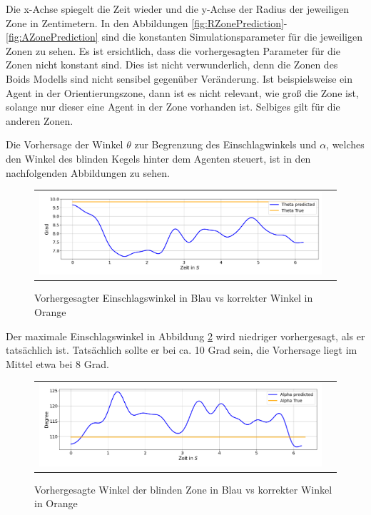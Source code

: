 Die x-Achse spiegelt die Zeit wieder und die y-Achse der Radius der jeweiligen Zone in Zentimetern. In den Abbildungen \ref{fig:RZonePrediction}-\ref{fig:AZonePrediction} sind die konstanten Simulationsparameter für die jeweiligen Zonen zu sehen. Es ist ersichtlich, dass die vorhergesagten Parameter für die Zonen nicht konstant sind.
Dies ist nicht verwunderlich, denn die Zonen des Boids Modells sind nicht sensibel gegenüber Veränderung.
Ist beispielsweise ein Agent in der Orientierungszone, dann ist es nicht relevant, wie groß die Zone ist, solange nur dieser eine Agent in der Zone vorhanden ist. Selbiges gilt für die anderen Zonen.

Die Vorhersage der Winkel $\theta$ zur Begrenzung des Einschlagwinkels und $\alpha$, welches den Winkel des blinden Kegels hinter dem Agenten steuert, ist in den nachfolgenden Abbildungen zu sehen.

\begin{figure}[H]
\centering
\begin{tabular}{cc}
\includegraphics[width=1.0\textwidth]{figures/Experimente/10Fisch/Theta.png} 
\end{tabular}
\caption{Vorhergesagter Einschlagswinkel in Blau vs korrekter Winkel in Orange \label{fig:AlphaStatischPrediction}}
\end{figure}


Der maximale Einschlagswinkel in Abbildung \ref{fig:AlphaStatischPrediction} wird niedriger vorhergesagt, als er tatsächlich ist. Tatsächlich sollte er bei ca. 10 Grad sein, die Vorhersage liegt im Mittel etwa bei 8 Grad.


\begin{figure}[H]
\centering
\begin{tabular}{cc}
\includegraphics[width=1.0\textwidth]{figures/Experimente/10Fisch/Alpha.png} 
\end{tabular}
\caption{Vorhergesagte Winkel der blinden Zone in Blau vs korrekter Winkel in Orange \label{fig:AlphaStatischPrediction}}
\end{figure}

